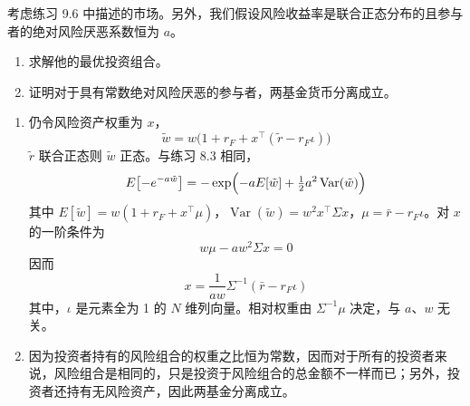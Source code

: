 \begin{problem}
 考虑练习 9.6 中描述的市场。另外，我们假设风险收益率是联合正态分布的且参与者的绝对风险厌恶系数恒为 $a$。
\begin{enumerate}[label=(\alph*)]
    \item 求解他的最优投资组合。
    \item 证明对于具有常数绝对风险厌恶的参与者，两基金货币分离成立。
\end{enumerate}
\end{problem}
\begin{solution}
\begin{enumerate}[label=(\alph*)]
    \item 仍令风险资产权重为 $x$，
    \[
        \tilde{w}=w\bigl(1+r_{F}+x^{\top}(\tilde{r}-r_{F}\iota)\bigr)
    \]
    $\tilde{r}$ 联合正态则 $\tilde{w}$ 正态。与练习 8.3 相同，
    \[
        E\bigl[-e^{-a\tilde{w}}\bigr]=-\exp\Bigl(-aE[\tilde{w}]+\tfrac12 a^{2}\operatorname{Var}(\tilde{w})\Bigr)
    \]
    其中 $E[\tilde{w}]=w(1+r_{F}+x^{\top}\mu)$，$\operatorname{Var}(\tilde{w})=w^{2}x^{\top}\Sigma x$，$\mu=\bar{r}-r_{F}\iota$。对 $x$ 的一阶条件为
    \[
        w\mu-aw^{2}\Sigma x=0
    \]
    因而
    \[
        x=\frac{1}{aw}\Sigma^{-1}(\bar{r}-r_{F}\iota)
    \]
    其中，$\iota$ 是元素全为 1 的 $N$ 维列向量。相对权重由 $\Sigma^{-1}\mu$ 决定，与 $a$、$w$ 无关。

    \item 因为投资者持有的风险组合的权重之比恒为常数，因而对于所有的投资者来说，风险组合是相同的，只是投资于风险组合的总金额不一样而已；另外，投资者还持有无风险资产，因此两基金分离成立。
\end{enumerate}
\end{solution}

